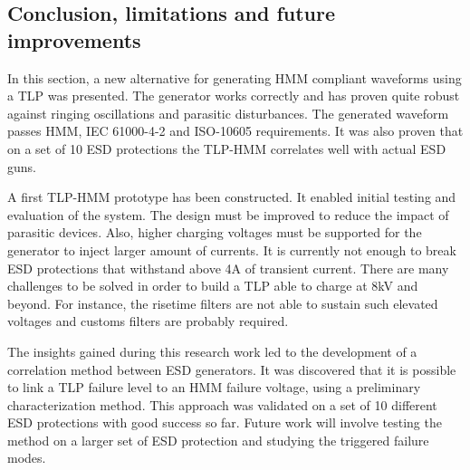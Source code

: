 \subsection{Conclusion, limitations and future improvements}

In this section, a new alternative for generating HMM compliant waveforms using a TLP was presented.
The generator works correctly and has proven quite robust against ringing oscillations and parasitic disturbances.
The generated waveform passes HMM, IEC 61000-4-2 and ISO-10605 requirements.
It was also proven that on a set of 10 ESD protections the TLP-HMM correlates well with actual ESD guns.

A first TLP-HMM prototype has been constructed.
It enabled initial testing and evaluation of the system.
The design must be improved to reduce the impact of parasitic devices.
Also, higher charging voltages must be supported for the generator to inject larger amount of currents.
It is currently not enough to break ESD protections that withstand above 4A of transient current.
There are many challenges to be solved in order to build a TLP able to charge at 8kV and beyond.
For instance, the risetime filters are not able to sustain such elevated voltages and customs filters are probably required.

The insights gained during this research work led to the development of a correlation method between ESD generators.
It was discovered that it is possible to link a TLP failure level to an HMM failure voltage, using a preliminary characterization method.
This approach was validated on a set of 10 different ESD protections with good success so far.
Future work will involve testing the method on a larger set of ESD protection and studying the triggered failure modes.
